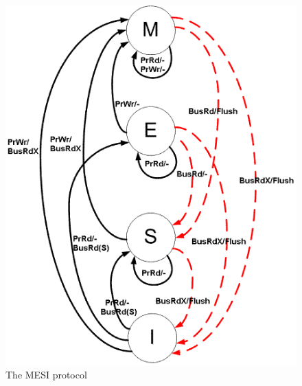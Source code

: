 \documentclass{article}
\begin{document}
\begin{figure}[H]
\begin{center}
\includegraphics[scale=0.4]{images/MESI.png}
\end{center}
\caption{The MESI protocol}
\label{MESI}
\end{figure}
\end{document}
